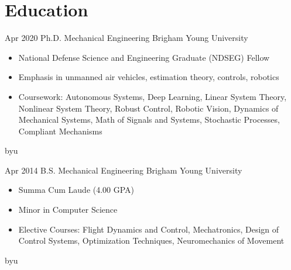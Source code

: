 \section{Education}

\begin{entrylist}
\logoentry
{Apr 2020}
{Ph.D. Mechanical Engineering}
{Brigham Young University}
{%
\vspace{-1em}
\begin{itemize}
    \item National Defense Science and Engineering Graduate (NDSEG) Fellow
    \item Emphasis in unmanned air vehicles, estimation theory, controls, robotics
    \item Coursework: Autonomous Systems, Deep Learning, Linear System Theory, Nonlinear System Theory, Robust Control, Robotic Vision, Dynamics of Mechanical Systems, Math of Signals and Systems, Stochastic Processes, Compliant Mechanisms
\end{itemize}
}
{byu}

\logoentry
{Apr 2014}
{B.S. Mechanical Engineering}
{Brigham Young University}
{%
\vspace{-1em}
\begin{itemize}
    \item Summa Cum Laude (4.00 GPA)
    \item Minor in Computer Science
    \item Elective Courses: Flight Dynamics and Control, Mechatronics, Design of Control Systems, Optimization Techniques, Neuromechanics of Movement
\end{itemize}
}
{byu}
\end{entrylist}